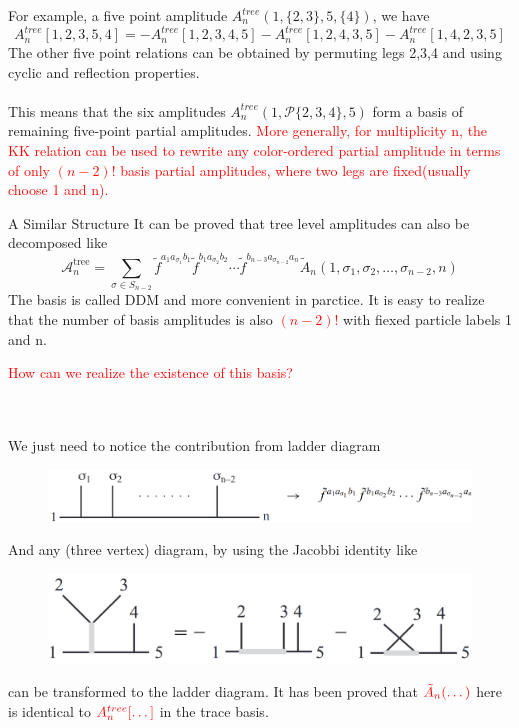 \documentclass{beamer}
\begin{document}
\begin{frame}
    For example, a five point amplitude $A_n^{tree}(1,\{2,3\},5,\{4\})$, we have
\begin{equation*}
    A_n^{tree}[1,2,3,5,4]=-A_n^{tree}[1,2,3,4,5]-A_n^{tree}[1,2,4,3,5]-A_n^{tree}[1,4,2,3,5]
\end{equation*}
The other five point relations can be obtained by permuting legs 2,3,4 and using cyclic and reflection properties.
\\ \hspace*{\fill}\\
This means that the six amplitudes $A_n^{tree}(1,\mathcal{P}\{2,3,4 \},5 )$ form a basis of remaining five-point partial amplitudes.
\textcolor{red}{More generally, for multiplicity n, the KK relation can be used to rewrite any color-ordered partial amplitude in terms of only $(n-2)!$
basis partial amplitudes, where two legs are fixed(usually choose 1 and n).}
\end{frame}
\begin{frame}{A Similar Structure}
    It can be proved that tree level amplitudes can also be decomposed like 
\begin{equation*}
    \mathcal{A}_n^\text{tree}=\sum_{\sigma\in S_{n-2}}\tilde{f}^{a_1a_{\sigma_1}b_1}\tilde{f}^{b_1a_{\sigma_2}b_2}\cdots\tilde{f}^{b_{n-3}a_{\sigma_{n-2}}a_n}\tilde{A}_n(1,\sigma_1,\sigma_2,\ldots,\sigma_{n-2},n)
\end{equation*}
The basis is called DDM and more convenient in parctice. It is easy to realize that the number of basis amplitudes is also \textcolor{red}{$(n-2)!$} with fiexed particle labels 1 and n.
\end{frame}
\begin{frame}
    \begin{Large}
        \textcolor{red}{How can we realize the existence of this basis?}
    \end{Large}
\\ \hspace*{\fill}\\
We just need to notice the contribution from ladder diagram
\begin{figure}[htb]
    \centering
    \includegraphics[width=1\linewidth]{1.png}
\end{figure}
And any (three vertex) diagram, by using the Jacobbi identity like 
\begin{figure}[htb]
    \centering
    \includegraphics[width=1\linewidth]{2.png}
\end{figure}
can be transformed to the ladder diagram. It has been proved that $\textcolor{red}{\tilde{A}_n(\dots)}$ here is identical to $\textcolor{red}{A_n^{tree}[\dots]}$ in the trace basis.
\end{frame}
\end{document}
